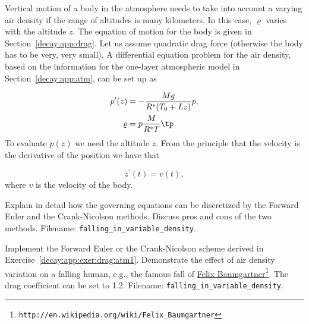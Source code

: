 \documentclass[graybox,sectrefs,envcountresetchap,open=right,final]{svmonodo}
\makeatletter
\newenvironment{doconceexercise}{}{}
\newcounter{doconceexercisecounter}%
\newcommand\listofexercises{
\chapter*{List of Exercises, Problems, and Projects
          \@mkboth{List of Exercises, Problems, and Projects}{List of Exercises, Problems, and Projects}}
\markboth{List of Exercises, Problems, and Projects}{List of Exercises, Problems, and Projects}
\@starttoc{loe}
}
\makeatother
\begin{document}
\begin{doconceexercise}

                
\label{decay:app:exer:drag:atm1}

Vertical motion of a body in the atmosphere needs to take into
account a varying air density if the range of altitudes is
many kilometers. In this case, $\varrho$ varies with the altitude $z$.
The equation of motion for the body is given in
Section~\ref{decay:app:drag}. Let us assume quadratic drag force
(otherwise the body has to be very, very small).
A differential equation problem for the air density, based on
the information for the one-layer atmospheric model in
Section~\ref{decay:app:atm}, can be set up as

\begin{align}
p^{\prime}(z) &= -\frac{Mg}{R^*(T_0+Lz)} p,\\ 
\varrho &= p \frac{M}{R^*T}
\tp
\end{align}
To evaluate $p(z)$ we need the altitude $z$. From the principle that the
velocity is the derivative of the position we have that

\begin{equation}
z^{\prime}(t) = v(t),
\end{equation}
where $v$ is the velocity of the body.

Explain in detail how the governing equations can be discretized
by the Forward Euler and the Crank-Nicolson methods.
Discuss pros and cons of the two methods.
\noindent Filename: \Verb!falling_in_variable_density!.

\end{doconceexercise}

\begin{doconceexercise}

                
\label{decay:app:exer:drag:atm2}

Implement the Forward Euler or the Crank-Nicolson scheme
derived in Exercise~\ref{decay:app:exer:drag:atm1}.
Demonstrate the effect of air density variation on a falling
human, e.g., the famous fall of \href{{http://en.wikipedia.org/wiki/Felix_Baumgartner}}{Felix Baumgartner}\footnote{\texttt{http://en.wikipedia.org/wiki/Felix\_Baumgartner}}. The drag coefficient can be set to 1.2.
\noindent Filename: \Verb!falling_in_variable_density!.

\end{doconceexercise}
\end{document}
